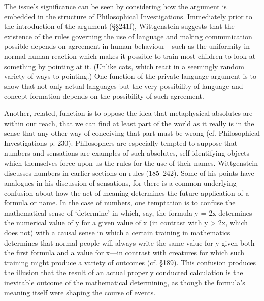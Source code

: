 The issue's significance can be seen by considering how the argument is embedded
in the structure of Philosophical Investigations. Immediately prior to the
introduction of the argument (§§241f), Wittgenstein suggests that the existence
of the rules governing the use of language and making communication possible
depends on agreement in human behaviour—such as the uniformity in normal human
reaction which makes it possible to train most children to look at something by
pointing at it. (Unlike cats, which react in a seemingly random variety of ways
to pointing.) One function of the private language argument is to show that not
only actual languages but the very possibility of language and concept formation
depends on the possibility of such agreement.

Another, related, function is to oppose the idea that metaphysical absolutes are
within our reach, that we can find at least part of the world as it really is in
the sense that any other way of conceiving that part must be wrong (cf.
Philosophical Investigations p. 230). Philosophers are especially tempted to
suppose that numbers and sensations are examples of such absolutes,
self-identifying objects which themselves force upon us the rules for the use of
their names. Wittgenstein discusses numbers in earlier sections on rules
(185–242). Some of his points have analogues in his discussion of sensations,
for there is a common underlying confusion about how the act of meaning
determines the future application of a formula or name. In the case of numbers,
one temptation is to confuse the mathematical sense of ‘determine’ in which,
say, the formula y = 2x determines the numerical value of y for a given value of
x (in contrast with y > 2x, which does not) with a causal sense in which a
certain training in mathematics determines that normal people will always write
the same value for y given both the first formula and a value for x—in contrast
with creatures for which such training might produce a variety of outcomes (cf.
§189). This confusion produces the illusion that the result of an actual
properly conducted calculation is the inevitable outcome of the mathematical
determining, as though the formula's meaning itself were shaping the course of
events.

